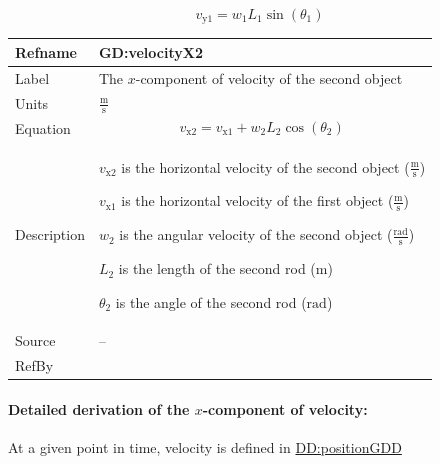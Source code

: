\documentclass[12pt]{article}
\begin{document}
\begin{displaymath}
{v_{\text{y}1}}={w_{1}} {L_{1}} \sin\left({θ_{1}}\right)
\end{displaymath}
\vspace{\baselineskip}
\noindent
\begin{minipage}{\textwidth}
\begin{tabular}{>{\raggedright}p{}>{\raggedright\arraybackslash}p{}}
\toprule \textbf{Refname} & \textbf{GD:velocityX2}
\label{GD:velocityX2}
\\ \midrule
Label & The $x$-component of velocity of the second object
        
\\ \midrule
Units & $\frac{\text{m}}{\text{s}}$
        
\\ \midrule
Equation & \begin{displaymath}
           {v_{\text{x}2}}={v_{\text{x}1}}+{w_{2}} {L_{2}} \cos\left({θ_{2}}\right)
           \end{displaymath}
\\ \midrule
Description & \begin{symbDescription}
              \item{${v_{\text{x}2}}$ is the horizontal velocity of the second object ($\frac{\text{m}}{\text{s}}$)}
              \item{${v_{\text{x}1}}$ is the horizontal velocity of the first object ($\frac{\text{m}}{\text{s}}$)}
              \item{${w_{2}}$ is the angular velocity of the second object ($\frac{\text{rad}}{\text{s}}$)}
              \item{${L_{2}}$ is the length of the second rod (${\text{m}}$)}
              \item{${θ_{2}}$ is the angle of the second rod (${\text{rad}}$)}
              \end{symbDescription}
\\ \midrule
Source & --
         
\\ \midrule
RefBy & 
\\ \bottomrule
\end{tabular}
\end{minipage}

\paragraph{Detailed derivation of the $x$-component of velocity:}
\label{GD:velocityX2Deriv}
At a given point in time, velocity is defined in \hyperref[DD:positionGDD]{DD:positionGDD}
\end{document}
